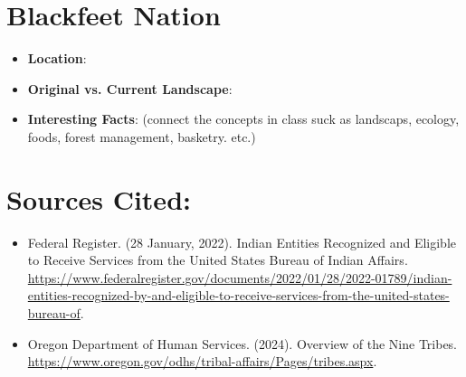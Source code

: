 \documentclass{article}
\begin{document}
\section*{Blackfeet Nation}
\begin{itemize}
    \item \textbf{Location}: 
    \item \textbf{Original vs. Current Landscape}: 
    \item \textbf{Interesting Facts}: (connect the concepts in class suck as landscaps, ecology, foods, forest management, basketry. etc.)
\end{itemize}

\section{Sources Cited:}
\begin{itemize}
    \item Federal Register. (28 January, 2022). Indian Entities Recognized and Eligible to Receive Services from the United States Bureau of Indian Affairs.\\ \url{https://www.federalregister.gov/documents/2022/01/28/2022-01789/indian-entities-recognized-by-and-eligible-to-receive-services-from-the-united-states-bureau-of}.
    \item Oregon Department of Human Services. (2024). Overview of the Nine Tribes.\\ \url{https://www.oregon.gov/odhs/tribal-affairs/Pages/tribes.aspx}.
\end{itemize}
\end{document}
